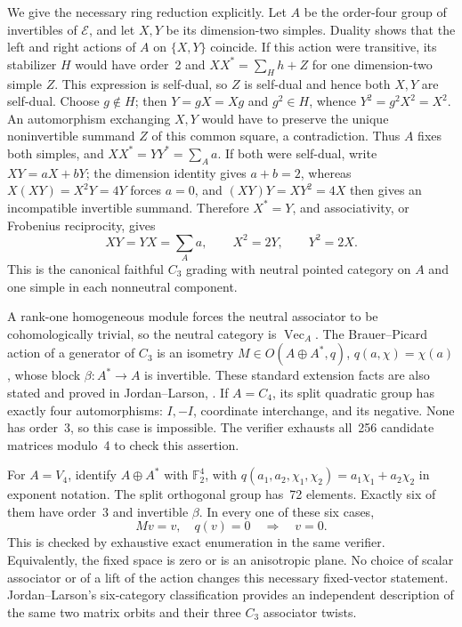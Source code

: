 We give the necessary ring reduction explicitly. Let $A$ be the
order-four group of invertibles of $\mathcal E$, and let $X,Y$ be its
dimension-two simples. Duality shows that the left and right actions of
$A$ on $\{X,Y\}$ coincide. If this action were transitive, its stabilizer
$H$ would have order~2 and
$XX^*=\sum_Hh+Z$ for one dimension-two simple $Z$. This expression is
self-dual, so $Z$ is self-dual and hence both $X,Y$ are self-dual.
Choose $g\notin H$; then $Y=gX=Xg$ and $g^2\in H$, whence
$Y^2=g^2X^2=X^2$. An automorphism exchanging $X,Y$ would have to preserve
the unique noninvertible summand $Z$ of this common square, a contradiction.
Thus $A$ fixes both simples, and $XX^*=YY^*=\sum_Aa$.
If both were self-dual, write $XY=aX+bY$; the dimension identity gives
$a+b=2$, whereas $X(XY)=X^2Y=4Y$ forces $a=0$, and
$(XY)Y=XY^2=4X$ then gives an incompatible invertible summand.
Therefore $X^*=Y$, and associativity, or Frobenius reciprocity, gives
\[
 XY=YX=\sum_Aa,\qquad X^2=2Y,\qquad Y^2=2X.
\]
This is the canonical faithful $C_3$ grading with neutral pointed category
on $A$ and one simple in each nonneutral component.

A rank-one homogeneous module forces the neutral associator to be
cohomologically trivial, so the neutral category is $\operatorname{Vec}_A$.
The Brauer--Picard action of a generator of $C_3$ is an isometry
$M\in O(A\oplus A^*,q)$, $q(a,\chi)=\chi(a)$, whose block
$\beta:A^*\to A$ is invertible. These standard extension facts are also
stated and proved in Jordan--Larson,
\cite[Lemma~2.6 and Proposition~3.1]{JordanLarson}. If $A=C_4$, its split quadratic group has exactly four
automorphisms: $I,-I$, coordinate interchange, and its negative. None has
order~3, so this case is impossible. The verifier exhausts all~256 candidate
matrices modulo~4 to check this assertion.

For $A=V_4$, identify $A\oplus A^*$ with $\mathbb F_2^4$, with
$q(a_1,a_2,\chi_1,\chi_2)=a_1\chi_1+a_2\chi_2$ in exponent notation.
The split orthogonal group has~72 elements. Exactly six of them have order~3
and invertible $\beta$. In every one of these six cases,
\begin{equation}\label{eq:d12-no-isotropic-fixed}
 Mv=v,\quad q(v)=0\quad\Longrightarrow\quad v=0.
\end{equation}
This is checked by exhaustive exact enumeration in the same verifier.
Equivalently, the fixed space is zero or is an anisotropic plane.
No choice of scalar associator or of a lift of the action changes this
necessary fixed-vector statement. Jordan--Larson's six-category
classification \cite[Theorem~1.4]{JordanLarson} provides an independent description of the same two matrix
orbits and their three $C_3$ associator twists.

